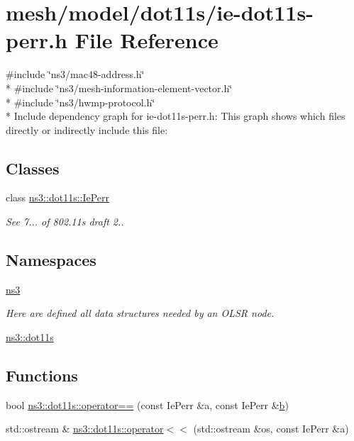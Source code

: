\hypertarget{ie-dot11s-perr_8h}{}\section{mesh/model/dot11s/ie-\/dot11s-\/perr.h File Reference}
\label{ie-dot11s-perr_8h}
{\ttfamily \#include \char`\"{}ns3/mac48-\/address.\+h\char`\"{}}\\*
{\ttfamily \#include \char`\"{}ns3/mesh-\/information-\/element-\/vector.\+h\char`\"{}}\\*
{\ttfamily \#include \char`\"{}ns3/hwmp-\/protocol.\+h\char`\"{}}\\*
Include dependency graph for ie-\/dot11s-\/perr.h\+:
This graph shows which files directly or indirectly include this file\+:
\subsection*{Classes}
\begin{DoxyCompactItemize}
\item 
class \hyperlink{classns3_1_1dot11s_1_1IePerr}{ns3\+::dot11s\+::\+Ie\+Perr}
\begin{DoxyCompactList}\small\item\em See 7... of 802.\+11s draft 2.. \end{DoxyCompactList}\end{DoxyCompactItemize}
\subsection*{Namespaces}
\begin{DoxyCompactItemize}
\item 
 \hyperlink{namespacens3}{ns3}
\begin{DoxyCompactList}\small\item\em Here are defined all data structures needed by an O\+L\+SR node. \end{DoxyCompactList}\item 
 \hyperlink{namespacens3_1_1dot11s}{ns3\+::dot11s}
\end{DoxyCompactItemize}
\subsection*{Functions}
\begin{DoxyCompactItemize}
\item 
bool \hyperlink{namespacens3_1_1dot11s_ad65ce7ffbc9dd8e7ba1d8771fca1bc55}{ns3\+::dot11s\+::operator==} (const Ie\+Perr \&a, const Ie\+Perr \&\hyperlink{lte__pathloss_8m_a21ad0bd836b90d08f4cf640b4c298e7c}{b})
\item 
std\+::ostream \& \hyperlink{namespacens3_1_1dot11s_a28e70b28570f80f59f0531d995b2cc0c}{ns3\+::dot11s\+::operator$<$$<$} (std\+::ostream \&os, const Ie\+Perr \&a)
\end{DoxyCompactItemize}
